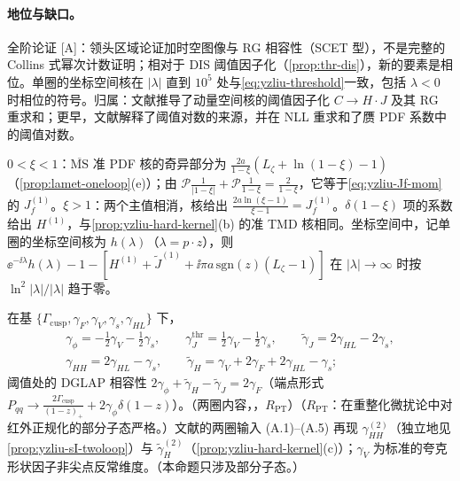 \paragraph{地位与缺口。}全阶论证 [A]：领头区域论证加时空图像与 RG 相容性（SCET 型），不是完整的 Collins 式幂次计数证明；相对于 DIS 阈值因子化（\cref{prop:thr-dis}），新的要素是相位。单圈的坐标空间核在 $|\lambda|$ 直到 $10^5$ 处与\cref{eq:yzliu-threshold}一致，包括 $\lambda<0$ 时相位的符号。归属：文献\cite{Ji:2023pba}推导了动量空间核的阈值因子化 $C\to H\cdot J$ 及其 RG 重求和；更早，文献\cite{Gao:2021hxl}解释了阈值对数的来源，并在 NLL 重求和了赝 PDF 系数中的阈值对数。

\begin{example}[阈值因子化的单圈检验]\label{ex:yzliu-threshold-oneloop}
$0<\xi<1$：$\overline{\mathrm{MS}}$ 准 PDF 核的奇异部分为 $\frac{2a}{1-\xi}(L_\zeta+\ln(1-\xi)-1)$（\cref{prop:lamet-oneloop}(e)）；由 $\mathcal P\frac1{|1-\xi|}+\mathcal P\frac1{1-\xi}=\frac2{1-\xi}$，它等于\cref{eq:yzliu-Jf-mom}的 $J^{(1)}_f$。$\xi>1$：两个主值相消，核给出 $\frac{2a\ln(\xi-1)}{\xi-1}=J^{(1)}_f$。$\delta(1-\xi)$ 项的系数给出 $H^{(1)}$，与\cref{prop:yzliu-hard-kernel}(b) 的准 TMD 核相同。坐标空间中，记单圈的坐标空间核为 $h(\lambda)$（$\lambda=p\cdot z$），则 $\ee^{-\ii\lambda}h(\lambda)-1-[H^{(1)}+\tilde J^{(1)}+\ii\pi a\,\mathrm{sgn}(z)(L_\zeta-1)]$ 在 $|\lambda|\to\infty$ 时按 $\ln^2|\lambda|/|\lambda|$ 趋于零。
\end{example}

\begin{proposition}\label{prop:yzliu-ad-algebra}
在基 $\{\Gamma_{\mathrm{cusp}},\gamma_F,\gamma_V,\gamma_s,\gamma_{HL}\}$ 下，%
\begin{equation}\label{eq:yzliu-ad-algebra}
\begin{gathered}
\gamma_\phi=-\tfrac12\gamma_V-\tfrac12\gamma_s,\qquad \gamma^{\mathrm{thr}}_J=\tfrac12\gamma_V-\tfrac12\gamma_s,\qquad \tilde\gamma_J=2\gamma_{HL}-2\gamma_s,\\
\gamma_{HH}=2\gamma_{HL}-\gamma_s,\qquad \tilde\gamma_H=\gamma_V+2\gamma_F+2\gamma_{HL}-\gamma_s ;
\end{gathered}
\end{equation}
阈值处的 DGLAP 相容性 $2\gamma_\phi+\tilde\gamma_H-\tilde\gamma_J=2\gamma_F$（端点形式 $P_{qq}\to\frac{2\Gamma_{\mathrm{cusp}}}{(1-z)_+}+2\gamma_\phi\delta(1-z)$）。（两圈内容，\tagR，$R_{\mathrm{PT}}$）（$R_{\mathrm{PT}}$：在重整化微扰论中对红外正规化的部分子态严格。）文献\cite{Ji:2023pba}的两圈输入 (A.1)--(A.5) 再现 $\gamma^{(2)}_{HH}$（独立地见\cref{prop:yzliu-sI-twoloop}）与 $\tilde\gamma^{(2)}_H$（\cref{prop:yzliu-hard-kernel}(c)）；$\gamma_V$ 为标准的夸克形状因子非尖点反常维度。（本命题只涉及部分子态。）
\end{proposition}

